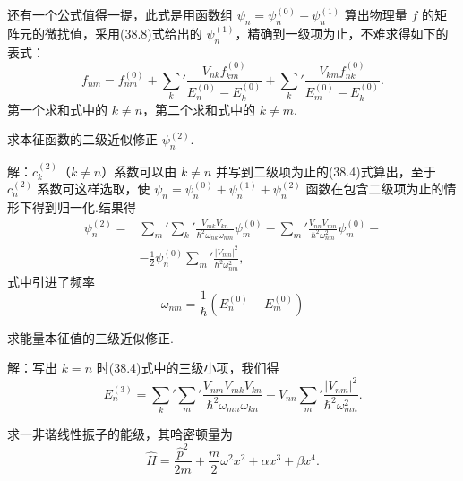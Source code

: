 还有一个公式值得一提，此式是用函数组 $\psi_n=\psi_n^{(0)}+\psi_n^{(1)}$ 算出物理量 $f$ 的矩阵元的微扰值，采用(38.8)式给出的 $\psi_n^{(1)}$，精确到一级项为止，不难求得如下的表式：
\begin{equation}
  f_{nm}=f_{nm}^{(0)}+\sum_k{}'\frac{V_{nk}f_{km}^{(0)}}{E_n^{(0)}-E_k^{(0)}}
  +\sum_k{}'\frac{V_{km}f_{nk}^{(0)}}{E_m^{(0)}-E_k^{(0)}}.
\end{equation}
第一个求和式中的 $k\neq n$，第二个求和式中的 $k\neq m$.

\begin{xiti}

\quad 求本征函数的二级近似修正 $\psi_n^{(2)}$.

解：$c_k^{(2)}$（$k\neq n$）系数可以由 $k\neq n$ 并写到二级项为止的(38.4)式算出，至于 $c_n^{(2)}$ 系数可这样选取，使 $\psi_n=\psi_n^{(0)}+\psi_n^{(1)}+\psi_n^{(2)}$ 函数在包含二级项为止的情形下得到归一化.结果得
\begin{equation*}
\begin{aligned}
  \psi_n^{(2)}={}&\sum_m{}'\sum_k{}'\frac{V_{mk}V_{kn}}{\hbar^2\omega_{nk}\omega_{nm}}\psi_m^{(0)}
  -\sum_m{}'\frac{V_{nn}V_{mn}}{\hbar^2\omega_{nm}^2}\psi_m^{(0)}-\\
  &-\frac{1}{2}\psi_n^{(0)}\sum_m{}'\frac{|V_{mn}|^2}{\hbar^2\omega_{nm}^2},
\end{aligned}
\end{equation*}
式中引进了频率
\begin{equation*}
  \omega_{nm}=\frac{1}{\hbar}\left(E_n^{(0)}-E_m^{(0)}\right)
\end{equation*}

\quad 求能量本征值的三级近似修正.

解：写出 $k=n$ 时(38.4)式中的三级小项，我们得
\begin{equation*}
  E_n^{(3)}=\sum_k{}'\sum_m{}'\frac{V_{nm}V_{mk}V_{kn}}{\hbar^2\omega_{mn}\omega_{kn}}
  -V_{nn}\sum_m{}'\frac{|V_{nm}|^2}{\hbar^2\omega_{mn}^2}.
\end{equation*}

\quad 求一非谐线性振子的能级，其哈密顿量为
\begin{equation*}
  \hat{H}=\frac{\hat{p}^2}{2m}+\frac{m}{2}\omega^2x^2+\alpha x^3+\beta x^4.
\end{equation*}


\end{xiti}
